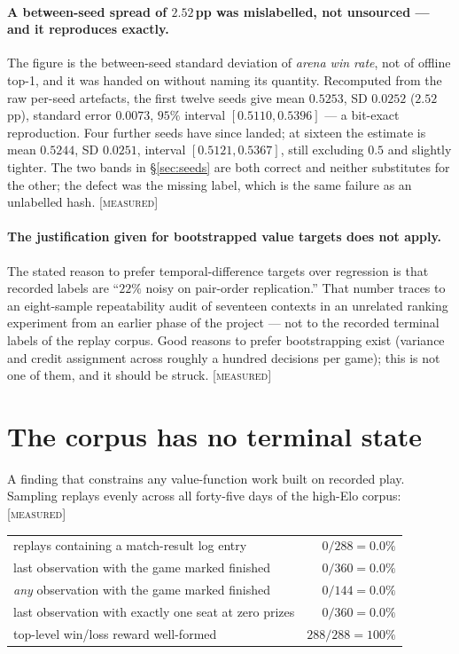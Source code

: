 \documentclass[11pt,a4paper]{article}
\newcommand{\tagM}{\textcolor{cV2}{\textsc{[measured]}}}
\begin{document}
\paragraph{A between-seed spread of $2.52$\,pp was mislabelled, not unsourced ---
and it reproduces exactly.} The figure is the between-seed standard deviation of
\emph{arena win rate}, not of offline top-1, and it was handed on without naming
its quantity. Recomputed from the raw per-seed artefacts, the first twelve seeds
give mean $0.5253$, SD $0.0252$ ($2.52$\,pp), standard error $0.0073$, $95\%$
interval $[0.5110, 0.5396]$ --- a bit-exact reproduction. Four further seeds have
since landed; at sixteen the estimate is mean $0.5244$, SD $0.0251$, interval
$[0.5121, 0.5367]$, still excluding $0.5$ and slightly tighter. The two bands in
\S\ref{sec:seeds} are both correct and neither substitutes for the other; the
defect was the missing label, which is the same failure as an unlabelled hash. \tagM

\paragraph{The justification given for bootstrapped value targets does not
apply.} The stated reason to prefer temporal-difference targets over regression
is that recorded labels are ``$22\%$ noisy on pair-order replication.'' That
number traces to an eight-sample repeatability audit of seventeen contexts in an
unrelated ranking experiment from an earlier phase of the project --- not to the
recorded terminal labels of the replay corpus. Good reasons to prefer
bootstrapping exist (variance and credit assignment across roughly a hundred
decisions per game); this is not one of them, and it should be struck. \tagM

\section{The corpus has no terminal state}

A finding that constrains any value-function work built on recorded play.
Sampling replays evenly across all forty-five days of the high-Elo corpus: \tagM

\begin{center}
\begin{tabular}{lr}
\toprule
replays containing a match-result log entry & $0/288 = 0.0\%$ \\
last observation with the game marked finished & $0/360 = 0.0\%$ \\
\emph{any} observation with the game marked finished & $0/144 = 0.0\%$ \\
last observation with exactly one seat at zero prizes & $0/360 = 0.0\%$ \\
top-level win/loss reward well-formed & $288/288 = 100\%$ \\
\bottomrule
\end{tabular}
\end{center}
\end{document}
